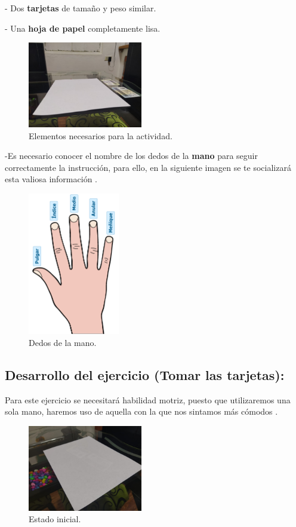 \documentclass{article}
\begin{document}
- Dos \textbf{tarjetas} de tamaño y peso similar.
\newline

- Una \textbf{hoja de papel} completamente lisa.
\begin{figure}[h]
\includegraphics[width=5cm]{elementos.jpeg}
\centering
\caption{Elementos necesarios para la actividad.}
\label{fig:elementos}
\end{figure}
\newline

-Es necesario conocer el nombre de los dedos de la \textbf{mano} para seguir correctamente la instrucción, para ello, en la siguiente imagen se te socializará esta valiosa información \cite{dedosmano}.
\newpage
\begin{figure}[h]
\includegraphics[width=4cm]{nombre_dedos_mano (1).png}
\centering
\caption{Dedos de la mano.}
\label{fig:fingers}
\end{figure}
\subsection{Desarrollo del ejercicio (Tomar las tarjetas): }
Para este ejercicio se necesitará habilidad motriz, puesto que utilizaremos una sola mano, haremos uso de aquella con 
la que nos sintamos más cómodos
.
\newline

\begin{figure}[h]
\includegraphics[width=5cm]{estado inicial.jpeg}
\centering
\caption{Estado inicial.}
\label{fig:inicial}
\end{figure}
\end{document}
